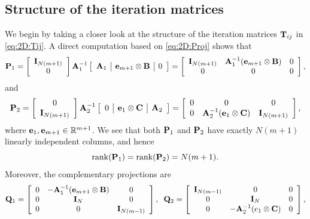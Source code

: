 \subsection{Structure of the iteration matrices}
\label{2D:bounds:structure}
%
We begin by taking a closer look at the structure of the iteration matrices
$\T_{ij}$ in \eqref{eq:2D:Tij}. A direct computation based on \eqref{eq:2D:Proj}
shows that
%
\begin{equation*}
\P_1 =
\left[ \begin{array}{c}
\I_{N(m+1)} \\
    0
\end{array} \right]
\A_1^{-1}
\left[ \begin{array}{c|c|c}
\A_1 & \e_{m+1}\otimes \B & 0
\end{array} \right]
=
\left[\begin{array}{ccc}
\I_{N(m+1)} & \A_1^{-1}(\e_{m+1}\otimes \B) & 0\\
  0    &                  0                 & 0
\end{array}\right],\nonumber
\end{equation*}
%
and
%
\begin{equation*}
\P_2 =
\left[\begin{array}{c}
    0    \\
\I_{N (m+1)}
\end{array}\right]
\A_2^{-1}
\left[\begin{array}{c|c|c}
 0 &  \e_{1}\otimes \C & \A_2
\end{array}\right]
=
\left[\begin{array}{ccc}
0 &           0                         & 0       \\
0 & \A_2^{-1}(\e_{1}\otimes \C) & \I_{N (m+1)}
\end{array}\right],\nonumber
\end{equation*}
%
where $\e_1,\e_{m+1}\in{\mathbb R}^{m+1}$. We see that both $\P_1$ and $\P_2$
have exactly $N(m+1)$ linearly independent columns, and hence
%
\begin{equation*}%
\mathrm{rank}(\P_1) = \mathrm{rank}(\P_2)=N(m+1).
\end{equation*}
%
Moreover, the complementary projections are
%
\begin{equation*}
\Q_1  =
\left[
  \begin{array}{ccc}
    0 & -\A_1^{-1}(\e_{m+1}\otimes \B)  & 0 \\
    0 & \I_{N}                            & 0 \\
    0 & 0                                & \I_{N(m-1)}
  \end{array}
\right],\;\;
\Q_2  =
\left[
  \begin{array}{ccc}
    \I_{N(m-1)} & 0                             & 0 \\
    0          & \I_{N}                         & 0 \\
    0          & -\A_2^{-1}(e_{1}\otimes \C) & 0
  \end{array}
\right],
\end{equation*}

